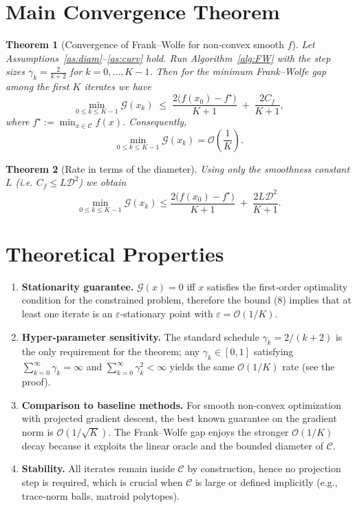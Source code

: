\documentclass{article}
\newtheorem{theorem}{Theorem}
\newcommand{\gap}{\mathcal{G}}
\newcommand{\diam}{\mathcal{D}}
\newcommand{\curv}{C_f}
\begin{document}
\section*{Main Convergence Theorem}
\begin{theorem}[Convergence of Frank–Wolfe for non‑convex smooth $f$]\label{thm:fw}
Let Assumptions~\ref{as:diam}–\ref{as:curv} hold.  
Run Algorithm~\ref{alg:FW} with the step sizes $\gamma_k=\frac{2}{k+2}$
for $k=0,\dots,K-1$. Then for the minimum Frank–Wolfe gap among the first
$K$ iterates we have
\[
\min_{0\le k\le K-1}\gap(x_k)\;\le\;
\frac{2\bigl(f(x_0)-f^\star\bigr)}{K+1}
\;+\;
\frac{2\curv}{K+1},
\tag{8}
\]
where $f^\star:=\min_{x\in\mathcal C}f(x)$. Consequently,
\[
\min_{0\le k\le K-1}\gap(x_k)=\mathcal O\!\left(\frac{1}{K}\right).
\]
\end{theorem}

\begin{theorem}[Rate in terms of the diameter]\label{thm:simple}
Using only the smoothness constant $L$ (i.e. $\curv\le L\diam^{2}$) we obtain
\[
\min_{0\le k\le K-1}\gap(x_k)\le
\frac{2\bigl(f(x_0)-f^\star\bigr)}{K+1}
\;+\;
\frac{2L\diam^{2}}{K+1}.
\tag{9}
\]
\end{theorem}

\section*{Theoretical Properties}
\begin{enumerate}[label=\arabic*.]
\item \textbf{Stationarity guarantee.}  $\gap(x)=0$ iff $x$ satisfies the
first‑order optimality condition for the constrained problem, therefore the
bound (8) implies that at least one iterate is an $\varepsilon$‑stationary
point with $\varepsilon = \mathcal O(1/K)$.
\item \textbf{Hyper‑parameter sensitivity.}  The standard schedule
$\gamma_k=2/(k+2)$ is the only requirement for the theorem; any
$\gamma_k\in[0,1]$ satisfying $\sum_{k=0}^{\infty}\gamma_k=\infty$ and
$\sum_{k=0}^{\infty}\gamma_k^{2}<\infty$ yields the same $\mathcal O(1/K)$
rate (see the proof).
\item \textbf{Comparison to baseline methods.}  For smooth non‑convex
optimization with projected gradient descent, the best known guarantee on the
gradient norm is $\mathcal O(1/\sqrt{K})$.  The Frank–Wolfe gap enjoys the
stronger $\mathcal O(1/K)$ decay because it exploits the linear oracle and the
bounded diameter of $\mathcal C$.
\item \textbf{Stability.}  All iterates remain inside $\mathcal C$ by construction,
hence no projection step is required, which is crucial when $\mathcal C$ is
large or defined implicitly (e.g., trace‑norm balls, matroid polytopes).
\end{enumerate}
\end{document}
